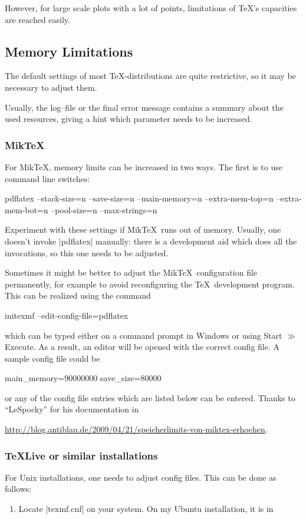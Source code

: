 {However, for large scale plots with a lot of points, limitations of \TeX's capacities are reached easily.

\subsection{Memory Limitations}
The default settings of most \TeX-distributions are quite restrictive, so it may be necessary to adjust them. 

Usually, the log--file or the final error message contains a summary about the used resources, giving a hint which parameter needs to be increased.

\subsubsection{Mik\TeX}
For Mik\TeX, memory limits can be increased in two ways. The first is to use command line switches:
\begin{codeexample}
pdflatex 
	--stack-size=n --save-size=n 
	--main-memory=n --extra-mem-top=n --extra-mem-bot=n
	--pool-size=n --max-strings=n 
\end{codeexample}
\noindent Experiment with these settings if Mik\TeX\ runs out of memory. Usually, one doesn't invoke |pdflatex| manually: there is a development aid which does all the invocations, so this one needs to be adjusted. 

Sometimes it might be better to adjust the Mik\TeX\ configuration file permanently, for example to avoid reconfiguring the \TeX\ development program. This can be realized using the command
\begin{codeexample}
initexmf --edit-config-file=pdflatex
\end{codeexample}
\noindent which can be typed either on a command prompt in Windows or using Start $\gg$ Execute. As a result, an editor will be opened with the correct config file. A sample config file could be
\begin{codeexample}
main_memory=90000000
save_size=80000
\end{codeexample}
or any of the config file entries which are listed below can be entered. 
Thanks to ``LeSpocky'' for his documentation in

\url{http://blog.antiblau.de/2009/04/21/speicherlimits-von-miktex-erhoehen}.

\subsubsection{\TeX Live or similar installations}
For Unix installations, one needs to adjust config files. This can be done as follows:
\begin{enumerate}
	\item Locate |texmf.cnf| on your system. On my Ubuntu installation, it is in 
	

\end{enumerate}}
